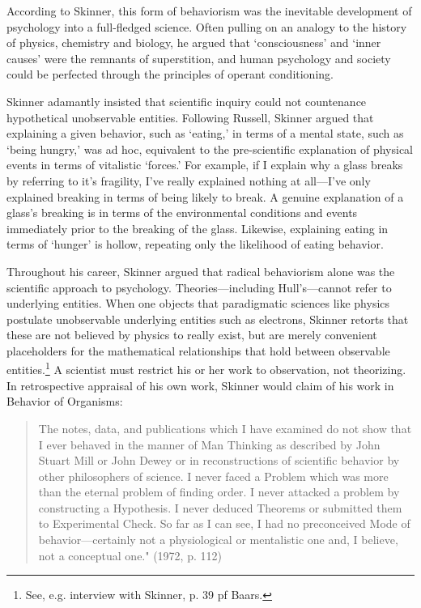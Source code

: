 According to Skinner, this form of behaviorism was the inevitable development of psychology into a full-fledged science. Often pulling on an analogy to the history of physics, chemistry and biology, he argued that `consciousness' and `inner causes' were the remnants of superstition, and human psychology and society could be perfected through the principles of operant conditioning. 

Skinner adamantly insisted that scientific inquiry could not countenance hypothetical unobservable entities. Following Russell, Skinner argued that explaining a given behavior, such as `eating,' in terms of a mental state, such as `being hungry,' was ad hoc, equivalent to the pre-scientific explanation of physical events in terms of vitalistic `forces.' For example, if I explain why a glass breaks by referring to it's fragility, I've really explained nothing at all---I've only explained breaking in terms of being likely to break. A genuine explanation of a glass's breaking is in terms of the environmental conditions and events immediately prior to the breaking of the glass. Likewise, explaining eating in terms of `hunger' is hollow, repeating only the likelihood of eating behavior.

Throughout his career, Skinner argued that radical behaviorism alone was the scientific approach to psychology. Theories---including Hull's---cannot refer to underlying entities. When one objects that paradigmatic sciences like physics postulate unobservable underlying entities such as electrons, Skinner retorts that these are not believed by physics to really exist, but are merely convenient placeholders for the mathematical relationships that hold between observable entities.\footnote{See, e.g. interview with Skinner, p. 39 pf Baars.} A scientist must restrict his or her work to observation, not theorizing. In retrospective appraisal of his own work, Skinner would claim of his work in Behavior of Organisms:

\begin{quote}

The notes, data, and publications which I have examined do not show that I ever behaved in the manner of Man Thinking as described by John Stuart Mill or John Dewey or in reconstructions of scientific behavior by other philosophers of science. I never faced a Problem which was more than the eternal problem of finding order. I never attacked a problem by constructing a Hypothesis. I never deduced Theorems or submitted them to Experimental Check. So far as I can see, I had no preconceived Mode of behavior---certainly not a physiological or mentalistic one and, I believe, not a conceptual one." (1972, p. 112)
\end{quote}

